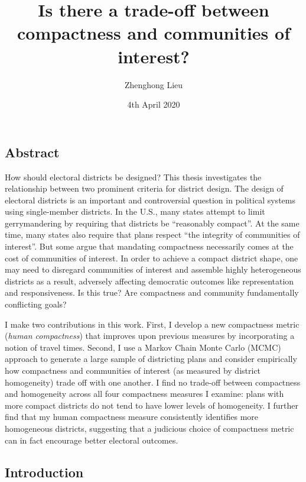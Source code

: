 \documentclass[]{article}
\title{Is there a trade-off between compactness and communities of interest?}
\author{Zhenghong Lieu}
\date{4th April 2020}
\begin{document}
\maketitle

\def\citeapos#1{\citeauthor{#1}'s (\citeyear{#1})}

\hypertarget{abstract}{%
\subsection{Abstract}\label{abstract}}

How should electoral districts be designed? This thesis investigates the
relationship between two prominent criteria for district design. The
design of electoral districts is an important and controversial question
in political systems using single-member districts. In the U.S., many
states attempt to limit gerrymandering by requiring that districts be
``reasonably compact''. At the same time, many states also require that
plans respect ``the integrity of communities of interest''. But some
argue that mandating compactness necessarily comes at the cost of
communities of interest. In order to achieve a compact district shape,
one may need to disregard communities of interest and assemble highly
heterogeneous districts as a result, adversely affecting democratic
outcomes like representation and responsiveness. Is this true? Are
compactness and community fundamentally conflicting goals?

I make two contributions in this work. First, I develop a new
compactness metric (\emph{human compactness}) that improves upon
previous measures by incorporating a notion of travel times. Second, I
use a Markov Chain Monte Carlo (MCMC) approach to generate a large
sample of districting plans and consider empirically how compactness and
communities of interest (as measured by district homogeneity) trade off
with one another. I find no trade-off between compactness and
homogeneity across all four compactness measures I examine: plans with
more compact districts do not tend to have lower levels of homogeneity.
I further find that my human compactness measure consistently identifies
more homogeneous districts, suggesting that a judicious choice of
compactness metric can in fact encourage better electoral outcomes.

\hypertarget{introduction}{%
\subsection{Introduction}\label{introduction}}
\end{document}
